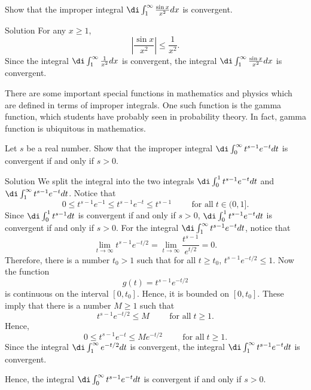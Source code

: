 \begin{example}[label=20230527]{}
\begin{example}
{}Show that the improper integral $\di\int_1^{\infty}\frac{\sin x}{x^2}dx$ is convergent. 
\end{example}
\begin{solution}{Solution}
For any $x\geq 1$,
\[\left|\frac{\sin x}{x^2}\right|\leq\frac{1}{x^2}.\]
Since the integral $\di\int_1^{\infty}\frac{1}{x^2}dx$ is convergent, the integral  $\di\int_1^{\infty}\frac{\sin x}{x^2}dx$ is convergent. 
\end{solution}

There are some important special functions in mathematics and physics which are defined in terms of improper integrals. One such function is the gamma function, which students have probably seen in probability theory. In fact, gamma function is ubiquitous in mathematics. 

\begin{example}{}
Let $s$ be a real number. Show that the improper integral $\di\int_0^{\infty}t^{s-1}e^{-t}dt$ is convergent if and only if $s>0$.
\end{example}
\begin{solution}{Solution}
We split the integral into the two integrals $\di\int_0^{1}t^{s-1}e^{-t}dt$ and $\di\int_1^{\infty}t^{s-1}e^{-t}dt$. Notice that
\[0\leq t^{s-1}e^{-1}\leq t^{s-1}e^{-t}\leq t^{s-1}\hspace{1cm}\text{for all}\; t\in (0,1].\]
Since $\di\int_0^1t^{s-1}dt$ is convergent if and only if $s>0$, $\di\int_0^1 t^{s-1}e^{-t}dt$ is convergent if and only if $s>0$. For the integral $\di \int_1^{\infty}t^{s-1}e^{-t}dt$, notice that
\[\lim_{t\to \infty}t^{s-1}e^{-t/2}=\lim_{t\to\infty} \frac{t^{s-1}}{e^{t/2}}=0.\]
Therefore, there is a number $t_0>1$ such that for all $t\geq t_0$, $t^{s-1}e^{-t/2}\leq 1$. Now the function
\[g(t)=t^{s-1}e^{-t/2}\] is continuous on the interval $[0, t_0]$. Hence, it is bounded on $[0, t_0]$. These imply that there is a number $M\geq 1$ such that
\[t^{s-1}e^{-t/2}\leq M\hspace{1cm}\text{for all}\;t\geq 1.\]
Hence,
\[0\leq t^{s-1}e^{-t}\leq Me^{-t/2}\hspace{1cm}\text{for all}\;t\geq 1.\]
Since the integral $\di \int_1^{\infty}e^{-t/2}dt$ is convergent, the integral  $\di\int_1^{\infty}t^{s-1}e^{-t}dt$ is convergent.

Hence, the integral  $\di\int_0^{\infty}t^{s-1}e^{-t}dt$ is convergent if and only if $s>0$.



\end{solution}
\end{example}
